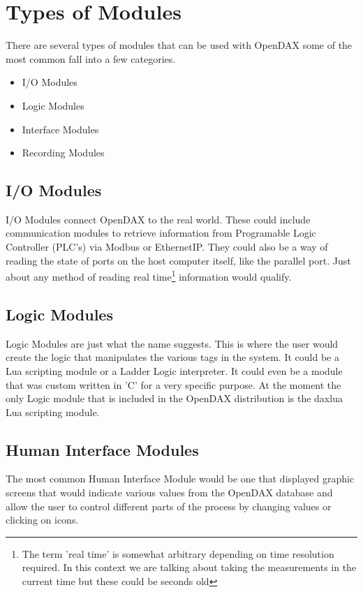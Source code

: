 \section{Types of Modules}
There are several types of modules that can be used with OpenDAX some of the most common fall into a few categories.

\begin{itemize}
\item I/O Modules
\item Logic Modules
\item Interface Modules
\item Recording Modules
\end{itemize}

\subsection*{I/O Modules}
I/O Modules connect OpenDAX to the real world. These could include communication modules to retrieve information from Programable Logic Controller (PLC's) via Modbus or EthernetIP.  They could also be a way of reading the state of ports on the host computer itself, like the parallel port.  Just about any method of reading real time\footnote{The term 'real time' is somewhat arbitrary depending on time resolution required.  In this context we are talking about taking the measurements in the current time but these could be seconds old} information would qualify.

\subsection*{Logic Modules}
Logic Modules are just what the name suggests.  This is where the user would create the logic that manipulates the various tags in the system.  It could be a Lua scripting module or a Ladder Logic interpreter.  It could even be a module that was custom written in 'C' for a very specific purpose.  At the moment the only Logic module that is included in the OpenDAX distribution is the daxlua Lua scripting module.

\subsection*{Human Interface Modules}
The most common Human Interface Module would be one that displayed graphic screens that would indicate various values from the OpenDAX database and allow the user to control different parts of the process by changing values or clicking on icons.

